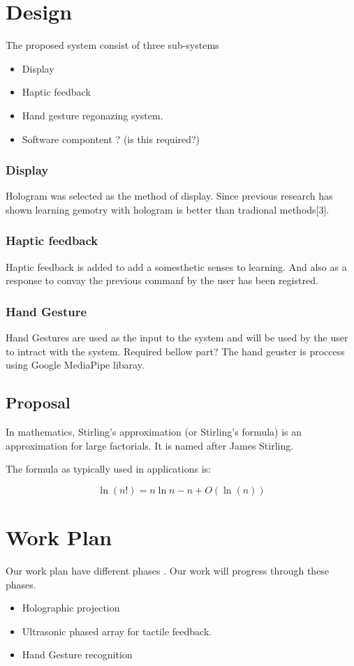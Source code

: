 \documentclass{fisatproject}
\begin{document}
\chapter{Design}

The proposed system consist of three sub-systems
\begin{itemize}
    \item  Display
    \item Haptic feedback
    \item Hand gesture regonazing system.
    \item Software compontent ? (is this required?)
\end{itemize}
\subsection{Display}
Hologram was selected as the method of display. Since previous  research has shown learning gemotry with hologram is better than tradional methods[3].

\subsection{Haptic feedback}
Haptic feedback is added to add a somesthetic senses to learning. And also as a response to convay the previous commanf by the user has been registred.

\subsection{Hand Gesture}
Hand Gestures are used as the input to the system and will be used by the user to intract with the system.
{Required bellow part?}
The hand geuster is proccess using Google  MediaPipe libaray.

\section{Proposal}
In mathematics, Stirling's approximation (or Stirling's formula) is an approximation for large factorials. It is named after James Stirling.

The formula as typically used in applications is:

$$
\ln (n!) = n \ln n - n  + O(\ln(n))
$$

\chapter{Work Plan}
Our work plan have different phases .
 Our work will progress through these phases.
 \begin{itemize}
     \item Holographic projection
     \item Ultrasonic phased array for tactile feedback.
     \item Hand Gesture recognition
 \end{itemize}
\end{document}
